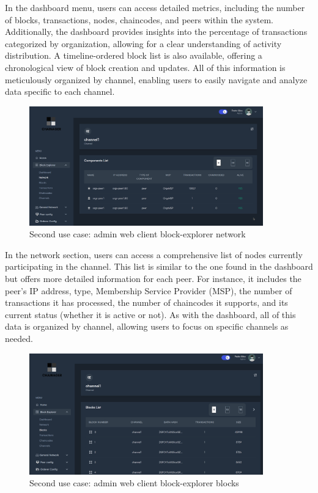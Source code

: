 In the dashboard menu, users can access detailed metrics, including the number of blocks, transactions, nodes, chaincodes, and peers within the system. Additionally, the dashboard provides insights into the percentage of transactions categorized by organization, allowing for a clear understanding of activity distribution. A timeline-ordered block list is also available, offering a chronological view of block creation and updates. All of this information is meticulously organized by channel, enabling users to easily navigate and analyze data specific to each channel.

\begin{figure}[H]
    \centering
    \includegraphics[width=0.9\textwidth]{assets/use-case-2/block-explorer-network.png} %
    \caption{Second use case: admin web client block-explorer network}
    \label{fig:sample-image} 
\end{figure}

In the network section, users can access a comprehensive list of nodes currently participating in the channel. This list is similar to the one found in the dashboard but offers more detailed information for each peer. For instance, it includes the peer's IP address, type, Membership Service Provider (MSP), the number of transactions it has processed, the number of chaincodes it supports, and its current status (whether it is active or not). As with the dashboard, all of this data is organized by channel, allowing users to focus on specific channels as needed.

\begin{figure}[H]
    \centering
    \includegraphics[width=0.9\textwidth]{assets/use-case-2/block-explorer-blocks.png} %
    \caption{Second use case: admin web client block-explorer blocks}
    \label{fig:sample-image} 
\end{figure}

